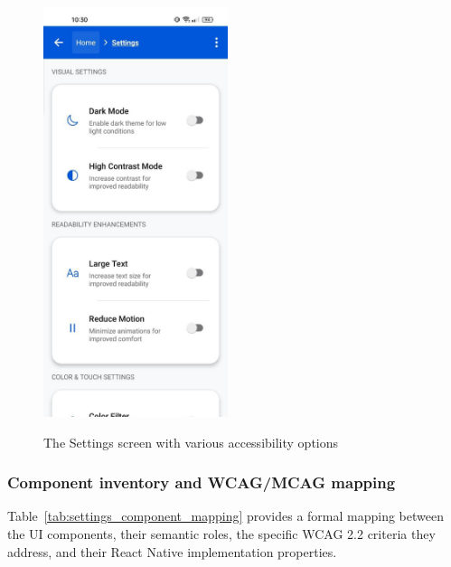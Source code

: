 \begin{figure}[ht]
    \centering
    \includegraphics[width=0.48\textwidth, alt={Settings Screen showing accessibility options}]{img/settings_normal.jpg}
    \caption{The Settings screen with various accessibility options}
    \label{fig:settings_screen_main}
\end{figure}

\subsubsection{Component inventory and WCAG/MCAG mapping}

Table~\ref{tab:settings_component_mapping} provides a formal mapping between the UI components, their semantic roles, the specific WCAG 2.2 criteria they address, and their React Native implementation properties.

